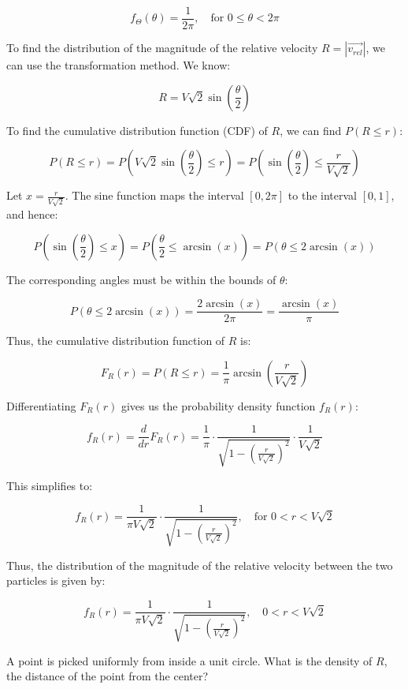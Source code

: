 \begin{solution}
\[
f_{\Theta}(\theta) = \frac{1}{2\pi}, \quad \text{for } 0 \leq \theta < 2\pi
\]

To find the distribution of the magnitude of the relative velocity \(R = |\vec{v_{rel}}|\), we can use the transformation method. We know:

\[
R = V \sqrt{2} \sin\left(\frac{\theta}{2}\right)
\]

To find the cumulative distribution function (CDF) of \(R\), we can find \(P(R \leq r)\):

\[
P(R \leq r) = P\left(V \sqrt{2} \sin\left(\frac{\theta}{2}\right) \leq r\right) = P\left(\sin\left(\frac{\theta}{2}\right) \leq \frac{r}{V \sqrt{2}}\right)
\]

Let \(x = \frac{r}{V \sqrt{2}}\). The sine function maps the interval \([0, 2\pi]\) to the interval \([0, 1]\), and hence:

\[
P\left(\sin\left(\frac{\theta}{2}\right) \leq x\right) = P\left(\frac{\theta}{2} \leq \arcsin(x)\right) = P\left(\theta \leq 2\arcsin(x)\right)
\]

The corresponding angles must be within the bounds of \(\theta\):

\[
P\left(\theta \leq 2\arcsin(x)\right) = \frac{2\arcsin(x)}{2\pi} = \frac{\arcsin(x)}{\pi}
\]

Thus, the cumulative distribution function of \(R\) is:

\[
F_R(r) = P(R \leq r) = \frac{1}{\pi} \arcsin\left(\frac{r}{V \sqrt{2}}\right)
\]

Differentiating \(F_R(r)\) gives us the probability density function \(f_R(r)\):

\[
f_R(r) = \frac{d}{dr} F_R(r) = \frac{1}{\pi} \cdot \frac{1}{\sqrt{1 - \left(\frac{r}{V \sqrt{2}}\right)^2}} \cdot \frac{1}{V \sqrt{2}}
\]

This simplifies to:

\[
f_R(r) = \frac{1}{\pi V \sqrt{2}} \cdot \frac{1}{\sqrt{1 - \left(\frac{r}{V \sqrt{2}}\right)^2}}, \quad \text{for } 0 < r < V \sqrt{2}
\]

Thus, the distribution of the magnitude of the relative velocity between the two particles is given by:

\[
f_R(r) = \frac{1}{\pi V \sqrt{2}} \cdot \frac{1}{\sqrt{1 - \left(\frac{r}{V \sqrt{2}}\right)^2}}, \quad 0 < r < V \sqrt{2}
\]
\end{solution}

\begin{exercise}
A point is picked uniformly from inside a unit circle. What is the density of \( R \), the distance of the point from the center?
\end{exercise}

